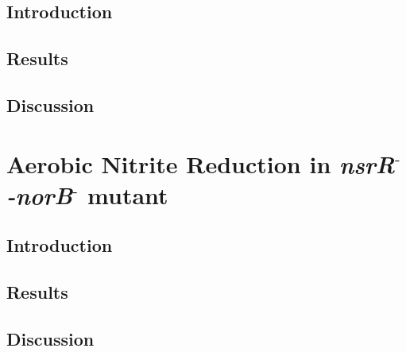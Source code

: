 \subsection{Introduction}
\subsection{Results}
\subsection{Discussion}
\section{Aerobic Nitrite Reduction in \textit{nsrR$^\textrm{-}$-norB$^\textrm{-}$} mutant}
\subsection{Introduction}
\subsection{Results}
\subsection{Discussion}